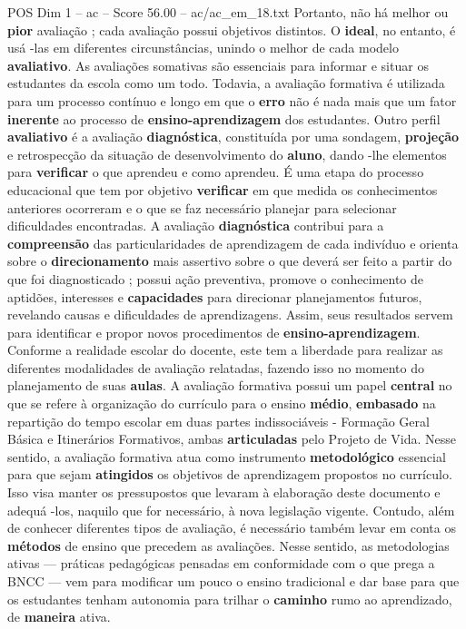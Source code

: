 \begin{textsample}{POS Dim 1 – ac – Score 56.00 – ac/ac\_em\_18.txt}
Portanto, não há melhor ou \textbf{pior} avaliação ; cada avaliação possui objetivos distintos.
O \textbf{ideal}, no entanto, é usá -las em diferentes circunstâncias, unindo o melhor de cada modelo \textbf{avaliativo}.
As avaliações somativas são essenciais para informar e situar os estudantes da escola como um todo.
Todavia, a avaliação formativa é utilizada para um processo contínuo e longo em que o \textbf{erro} não é nada mais que um fator \textbf{inerente} ao processo de \textbf{ensino-aprendizagem} dos estudantes.
Outro perfil \textbf{avaliativo} é a avaliação \textbf{diagnóstica}, constituída por uma sondagem, \textbf{projeção} e retrospecção da situação de desenvolvimento do \textbf{aluno}, dando -lhe elementos para \textbf{verificar} o que aprendeu e como aprendeu.
É uma etapa do processo educacional que tem por objetivo \textbf{verificar} em que medida os conhecimentos anteriores ocorreram e o que se faz necessário planejar para selecionar dificuldades encontradas.
A avaliação \textbf{diagnóstica} contribui para a \textbf{compreensão} das particularidades de aprendizagem de cada indivíduo e orienta sobre o \textbf{direcionamento} mais assertivo sobre o que deverá ser feito a partir do que foi diagnosticado ; possui ação preventiva, promove o conhecimento de aptidões, interesses e \textbf{capacidades} para direcionar planejamentos futuros, revelando causas e dificuldades de aprendizagens.
Assim, seus resultados servem para identificar e propor novos procedimentos de \textbf{ensino-aprendizagem}.
Conforme a realidade escolar do docente, este tem a liberdade para realizar as diferentes modalidades de avaliação relatadas, fazendo isso no momento do planejamento de suas \textbf{aulas}.
A avaliação formativa possui um papel \textbf{central} no que se refere à organização do currículo para o ensino \textbf{médio}, \textbf{embasado} na repartição do tempo escolar em duas partes indissociáveis - Formação Geral Básica e Itinerários Formativos, ambas \textbf{articuladas} pelo Projeto de Vida.
Nesse sentido, a avaliação formativa atua como instrumento \textbf{metodológico} essencial para que sejam \textbf{atingidos} os objetivos de aprendizagem propostos no currículo.
Isso visa manter os pressupostos que levaram à elaboração deste documento e adequá -los, naquilo que for necessário, à nova legislação vigente.
Contudo, além de conhecer diferentes tipos de avaliação, é necessário também levar em conta os \textbf{métodos} de ensino que precedem as avaliações.
Nesse sentido, as metodologias ativas — práticas pedagógicas pensadas em conformidade com o que prega a BNCC — vem para modificar um pouco o ensino tradicional e dar base para que os estudantes tenham autonomia para trilhar o \textbf{caminho} rumo ao aprendizado, de \textbf{maneira} ativa.

\end{textsample}

